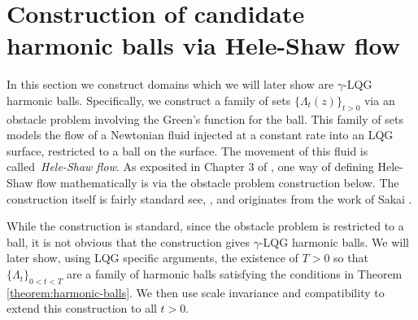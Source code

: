 \documentclass[12pt]{amsart}
\numberwithin{equation}{section}
\newcommand{\cluster}[2]{\hyperref[eq:non-co-set]{\mathit{\Lambda}^{#1}_{#2}}}
\begin{document}
	
	
	\section{Construction of candidate harmonic balls via Hele-Shaw flow} \label{sec:harmonic-ball-construction}
	
	
	In this section we construct domains which we will later show are $\gamma$-LQG harmonic balls. Specifically, we construct a family of sets $\{{\cluster{}{t}(z)}\}_{t > 0}$ via an obstacle problem involving the Green's function for the ball. This family of sets models the flow of a Newtonian fluid injected at a constant rate into an LQG surface, restricted to a ball on the surface. The movement of this fluid is called~\emph{Hele-Shaw flow}. As exposited in Chapter 3 of \cite{gustafsson2006conformal}, 
	one way of defining Hele-Shaw flow mathematically is via the obstacle problem construction below.  The construction itself is fairly standard see, \eg, \cite{gustafsson1990onquadraturedomains, hedenmalm2002hele,shahgholian2013harmonic} and originates from the work of Sakai \cite{sakai1984solutions}. 
	
	While the construction is standard, since the obstacle problem is restricted to a ball, it is not obvious that the construction gives $\gamma$-LQG harmonic balls. We will later show, using LQG specific arguments, the existence of $T > 0$ so that $\{{\cluster{}{t}}\}_{0 < t < T}$ are a family of harmonic balls satisfying the conditions in Theorem 
	\ref{theorem:harmonic-balls}. We then use scale invariance and compatibility to extend this construction to all $t > 0$.
	
	
	
	
	
	
\end{document}
